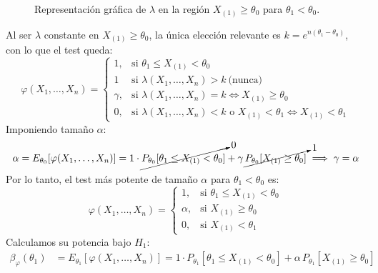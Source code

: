\begin{ejercicio}
\begin{description}
\begin{figure}[ht]
        \caption{Representación gráfica de $\lambda$ en la región $X_{(1)} \ge \theta_0$ para $\theta_1 < \theta_0$.}
        \label{fig:lambda_caso2}
    \end{figure}

    Al ser $\lambda$ constante en $X_{(1)} \ge \theta_0$, la única elección relevante es $k = e^{n(\theta_1 - \theta_0)}$, con lo que el test queda:
    \begin{equation*}
        \varphi(X_1, \dots, X_n) =
        \begin{cases}
            1, & \text{si } \theta_1 \le X_{(1)} < \theta_0 \\
            1 & \text{si } \lambda(X_1, \dots, X_n) > k\ \text{(nunca)} \\
            \gamma, & \text{si } \lambda(X_1, \dots, X_n) = k \iff X_{(1)} \ge \theta_0 \\
            0, & \text{si } \lambda(X_1, \dots, X_n) < k \text{ o } X_{(1)} < \theta_1 \iff X_{(1)} < \theta_1
        \end{cases}
    \end{equation*}
    Imponiendo tamaño $\alpha$:
    \begin{equation*}
        \alpha = E_{\theta_0}[\varphi(X_1, \dots, X_n)] = 1 \cdot \cancelto{0}{P_{\theta_0}[\theta_1 \le X_{(1)} < \theta_0]} + \gamma \, \cancelto{1}{P_{\theta_0}[X_{(1)} \ge \theta_0]} \implies \gamma = \alpha
    \end{equation*}
    Por lo tanto, el test más potente de tamaño $\alpha$ para $\theta_1 < \theta_0$ es:
    \begin{equation*}
        \varphi(X_1, \dots, X_n) =
        \begin{cases}
            1, & \text{si } \theta_1 \le X_{(1)} < \theta_0 \\
            \alpha, & \text{si } X_{(1)} \ge \theta_0 \\
            0, & \text{si } X_{(1)} < \theta_1
        \end{cases}
    \end{equation*}
    Calculamos su potencia bajo $H_1$:
    \begin{align*}
        \beta_\varphi(\theta_1) &= E_{\theta_1}[\varphi(X_1, \dots, X_n)] = 1 \cdot P_{\theta_1}[\theta_1 \le X_{(1)} < \theta_0] + \alpha \, P_{\theta_1}[X_{(1)} \ge \theta_0]
    \end{align*}
    

\end{description}
\end{ejercicio}
